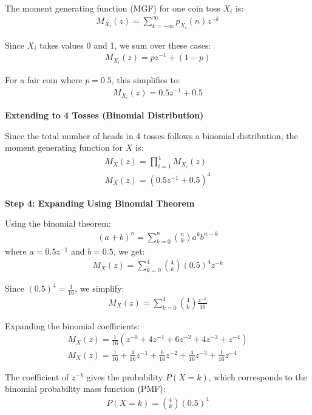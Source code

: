 \documentclass[journal]{IEEEtran}
\numberwithin{equation}{enumi}
\numberwithin{figure}{enumi}
\begin{document}
The moment generating function (MGF) for one coin toss \( X_i \) is:
\begin{align}
M_{X_i}(z) = \sum_{k=-\infty}^{\infty} p_{X_i}(n) z^{-k}
\end{align}

Since \( X_i \) takes values 0 and 1, we sum over these cases:
\begin{align}
M_{X_i}(z) = p z^{-1} + (1 - p)
\end{align}

For a fair coin where \( p = 0.5 \), this simplifies to:
\begin{align}
M_{X_i}(z) = 0.5z^{-1} + 0.5
\end{align}

\textbf{Extending to 4 Tosses (Binomial Distribution)}

Since the total number of heads in 4 tosses follows a binomial distribution, the moment generating function for \( X \) is:
\begin{align}
M_X(z) = \prod_{i=1}^{4} M_{X_i}(z) \\
M_X(z) = \left( 0.5z^{-1} + 0.5 \right)^4
\end{align}

\textbf{Step 4: Expanding Using Binomial Theorem}

Using the binomial theorem:
\begin{align}
(a + b)^n = \sum_{k=0}^{n} \binom{n}{k} a^k b^{n-k}
\end{align}
where \( a = 0.5z^{-1} \) and \( b = 0.5 \), we get:
\begin{align}
M_X(z) = \sum_{k=0}^{4} \binom{4}{k} (0.5)^4 z^{-k}
\end{align}

Since \( (0.5)^4 = \frac{1}{16} \), we simplify:
\begin{align}
M_X(z) = \sum_{k=0}^{4} \binom{4}{k} \frac{z^{-k}}{16}
\end{align}

Expanding the binomial coefficients:
\begin{align}
M_X(z) = \frac{1}{16} \left( z^{-0} + 4z^{-1} + 6z^{-2} + 4z^{-3} + z^{-4} \right) \\
M_X(z) = \frac{1}{16} + \frac{4}{16}z^{-1} + \frac{6}{16}z^{-2} + \frac{4}{16}z^{-3} + \frac{1}{16}z^{-4}
\end{align}

The coefficient of \( z^{-k} \) gives the probability \( P(X = k) \), which corresponds to the binomial probability mass function (PMF):
\begin{align}
P(X = k) = \binom{4}{k} (0.5)^4
\end{align}
\end{document}
